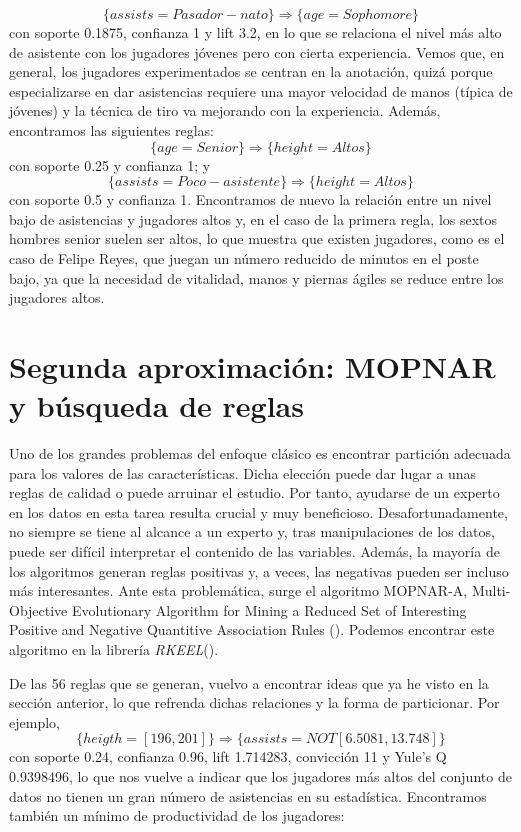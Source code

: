 $$\{assists=Pasador-nato\} \Rightarrow \{age=Sophomore\}$$
con soporte 0.1875, confianza 1 y lift 3.2, en lo que se relaciona el nivel más alto de asistente con los jugadores jóvenes pero con cierta experiencia. Vemos que, en general, los jugadores experimentados se centran en la anotación, quizá porque especializarse en dar asistencias requiere una mayor velocidad de manos (típica de jóvenes) y la técnica de tiro va mejorando con la experiencia. Además, encontramos las siguientes reglas:
$$\{age=Senior\} \Rightarrow \{height=Altos\}$$
con soporte 0.25 y confianza 1; y
$$\{assists=Poco-asistente\} \Rightarrow \{height = Altos\}$$
con soporte 0.5 y confianza 1. Encontramos de nuevo la relación entre un nivel bajo de asistencias y jugadores altos y, en el caso de la primera regla, los sextos hombres senior suelen ser altos, lo que muestra que existen jugadores, como es el caso de Felipe Reyes, que juegan un número reducido de minutos en el poste bajo, ya que la necesidad de vitalidad, manos y piernas ágiles se reduce entre los jugadores altos. 
 
\section{Segunda aproximación: MOPNAR y búsqueda de reglas}

Uno de los grandes problemas del enfoque clásico es encontrar partición adecuada para los valores de las características. Dicha elección puede dar lugar a unas reglas de calidad o puede arruinar el estudio. Por tanto, ayudarse de un experto en los datos en esta tarea resulta crucial y muy beneficioso. Desafortunadamente, no siempre se tiene al alcance a un experto y, tras manipulaciones de los datos, puede ser difícil interpretar el contenido de las variables. Además, la mayoría de los algoritmos generan reglas positivas y, a veces, las negativas pueden ser incluso más interesantes.  Ante esta problemática, surge el algoritmo MOPNAR-A, Multi-Objective Evolutionary Algorithm for Mining a Reduced Set of Interesting Positive and Negative Quantitive Association Rules (\cite{mopnar}). Podemos encontrar este algoritmo en la librería \textit{RKEEL}(\cite{rkeel}).

De las 56 reglas que se generan, vuelvo a encontrar ideas que ya he visto en la sección anterior, lo que refrenda dichas relaciones y la forma de particionar. Por ejemplo,
$$\{heigth=[196,201]\} \Rightarrow \{assists= NOT [6.5081,13.748]\}$$
con soporte 0.24, confianza 0.96, lift 1.714283, convicción 11 y Yule's Q 0.9398496, lo que nos vuelve a indicar que los jugadores más altos del conjunto de datos no tienen un gran número de asistencias en su estadística. Encontramos también un mínimo de productividad de los jugadores:

